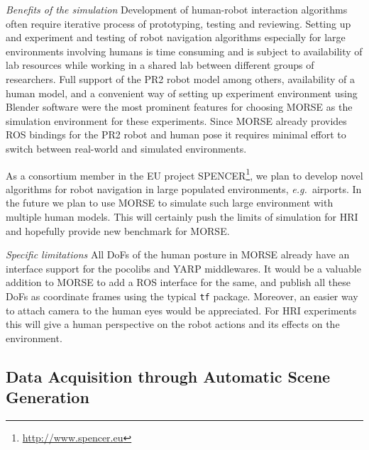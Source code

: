 \documentclass[conference]{IEEEtran}
\newcommand{\eg}{{\textit{e.g.~}}}
\begin{document}
\emph{Benefits of the simulation} Development of human-robot interaction
algorithms often require iterative process of prototyping, testing and
reviewing. Setting up and experiment and testing of robot navigation algorithms
especially for large environments involving humans is time consuming and is
subject to availability of lab resources while working in a shared lab between
different groups of researchers. Full support of the PR2 robot model among
others, availability of a human model, and a convenient way of setting up
experiment environment using Blender software were the most prominent features
for choosing MORSE as the simulation environment for these experiments. Since
MORSE already provides ROS bindings for the PR2 robot and human pose it requires
minimal effort to switch between real-world and simulated environments.

As a consortium member in the EU project
SPENCER\footnote{\url{http://www.spencer.eu}}, we plan to develop novel
algorithms for robot navigation in large populated environments, \eg airports.
In the future we plan to use MORSE to simulate such large environment with
multiple human models. This will certainly push the limits of simulation for HRI
and hopefully provide new benchmark for MORSE.

\emph{Specific limitations} All DoFs of the human posture in MORSE already have an
interface support for the {\sc pocolibs} and YARP middlewares. It would be a valuable
addition to MORSE to add a ROS interface for the same, and publish all these
DoFs as coordinate frames using the typical {\tt tf} package. Moreover, an easier
way to attach camera to the human eyes would be appreciated. For HRI experiments
this will give a human perspective on the robot actions and its effects on the
environment.


\subsection{Data Acquisition through Automatic Scene Generation}
\label{sc:generation}
\end{document}
